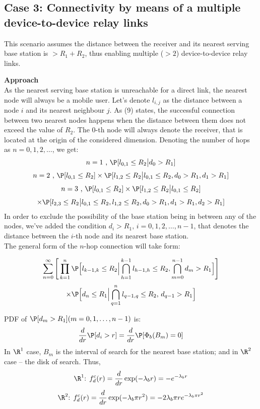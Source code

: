 \subsection {Case 3: Connectivity by means of a multiple device-to-device relay links}
This scenario assumes the distance between the receiver and its nearest serving base station is $> R_1+R_2$, thus enabling multiple ($>2$) device-to-device relay links.
\par {\bf Approach}
\\As the nearest serving base station is unreachable for a direct link, the nearest node will always be a mobile user.
Let's denote \(l_{i,j}\) as the distance between a node \(i\) and its nearest neighbour \(j\).
As (9) states, the successful connection between two nearest nodes happens when the distance between them does not exceed the value of \(R_2\).
The \(0\)-th node will always denote the receiver, that is located at the origin of the considered dimension.
Denoting the number of hops as \(n=0,1,2,\dots\), we get:
\[n=1\text{ , }\P[l_{0,1}\le R_2\big|d_0>R_1]\]
\[n=2\text{ , }\P[l_{0,1}\le R_2]\times\P[l_{1,2}\le R_2\big|l_{0,1}\le R_2,d_0>R_1,d_1>R_1]\]
\[n=3\text{ , }\P[l_{0,1}\le R_2]\times\P[l_{1,2}\le R_2\big|l_{0,1}\le R_2]\]
\[\times\P[l_{2,3}\le R_2\big|l_{0,1}\le R_2,l_{1,2}\le R_2,d_0>R_1,d_1>R_1,d_2>R_1]\]
In order to exclude the possibility of the base station being in between any of the nodes, we've added the condition \(d_{i}>R_1\text{, }i=0,1,2,\dots,n-1\), that denotes the distance between the \(i\)-th node and its nearest base station.
\\The general form of the \(n\)-hop connection will take form:
\begin{framed}
\[\sum_{n=0}^{\infty}\Bigg[\prod_{k=1}^{n}\P\Big[l_{k-1,k}\le R_2\Big|\bigcap\limits_{h=1}^{k-1}l_{h-1,h}\le R_2, \bigcap\limits_{m=0}^{n-1}d_m>R_1\Big]\Bigg]\]
\begin{equation}
\times\P\Big[d_{n}\le R_1\Big|\bigcap\limits_{q=1}^{n}l_{q-1,q}\le R_2\text{, }d_{q-1}>R_1\Big]
\end{equation}
\end{framed}
PDF of \(\P[d_m>R_1] (m=0,1,\dots,n-1)\) is:
\[\frac{d}{dr}\P[d_i>r]=\frac{d}{dr}\P[\Phi_b(B_m)=0]\]
In \(\R^1\) case, \(B_m\) is the interval of search for the nearest base station; and in \(\R^2\) case -- the disk of search. Thus,
\begin{equation}
\R^1\text{: }f^c_d(r)=\frac{d}{dr}\exp(-\lambda_br)=-e^{-\lambda_br}
\end{equation}
\begin{equation}
\R^2\text{: }f^c_d(r)=\frac{d}{dr}\exp(-\lambda_b\pi r^2)=-2\lambda_b\pi re^{-\lambda_b\pi r^2}
\end{equation}

